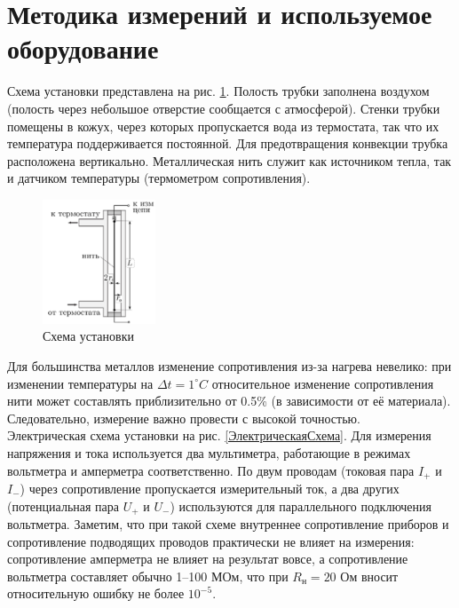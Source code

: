 \documentclass[a4paper, 12pt]{article}
\begin{document}
    \section*{Методика измерений и используемое оборудование}
    
        \noindent Схема установки представлена на рис. \ref{Схема установки}. Полость трубки заполнена воздухом (полость через небольшое отверстие сообщается с атмосферой). Стенки трубки помещены в кожух, через которых пропускается вода из термостата, так что их температура поддерживается постоянной. Для предотвращения конвекции трубка расположена вертикально. Металлическая нить служит как источником тепла, так и датчиком температуры (термометром сопротивления).

        \begin{figure}[H]
            \centering
            \includegraphics[width=0.3\textwidth]{images/tube.png}
            \caption{Схема установки} 
            \label{Схема установки}
        \end{figure}

        \noindent Для большинства металлов изменение сопротивления из-за нагрева невелико: при изменении температуры на $\Delta t = 1 ^\circ C$ относительное изменение сопротивления нити может составлять приблизительно от 0.5\% (в зависимости от её материала). Следовательно, измерение важно провести с высокой точностью.\\
        
        \noindent Электрическая схема установки на рис. \ref{ЭлектрическаяСхема}.  Для измерения напряжения и тока используется два мультиметра, работающие в режимах вольтметра и амперметра соответственно. По двум проводам (токовая пара $I_+$ и $I_-$) через сопротивление пропускается измерительный ток, а два других (потенциальная пара $U_+$ и $U_-$) используются для параллельного подключения вольтметра. Заметим, что при такой схеме внутреннее сопротивление приборов и сопротивление подводящих проводов практически не влияет на измерения: сопротивление амперметра не влияет на результат вовсе, а сопротивление вольтметра составляет обычно 1–100 МОм, что при $R_\text{н} = 20 \text{ Ом}$ вносит относительную ошибку не более $10^{-5}$.
\end{document}

